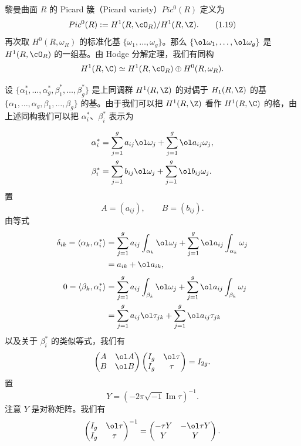 黎曼曲面 $R$ 的 Picard 簇（Picard variety）$Pic^0(R)$ 定义为
\begin{equation}
  Pic^0(R):=H^1(R,\cO_R)/H^1(R,\Z). \tag{1.19}
\end{equation}
再次取 $H^0(R,\omega_R)$ 的标准化基 $\{\omega_1,\dots,\omega_g\}$。那么 $\{\ol\omega_1,\dots,\ol\omega_g\}$ 是 $H^1(R,\cO_R)$ 的一组基。由 Hodge 分解定理，我们有同构
\[
  H^1(R,\C)\simeq H^1(R,\cO_R)\oplus H^0(R,\omega_R).
\]
\begin{sloppypar}设 $\{\alpha_1^*,\dots,\alpha_g^*,\beta_1^*,\dots,\beta_g^*\}$ 是上同调群 $H^1(R,\Z)$ 的对偶于 $H_1(R,\Z)$ 的基 $\{\alpha_1,\dots,\alpha_g,\beta_1,\dots,\beta_g\}$ 的基。由于我们可以把 $H^1(R,\Z)$ 看作 $H^1(R,\C)$ 的格，由上述同构我们可以把 $\alpha_i^*$、$\beta_i^*$ 表示为
\end{sloppypar}
\[
\begin{aligned}
  \alpha_i^* &= \sum_{j=1}^{g}a_{ij}\ol\omega_j+\sum_{j=1}^{g}\ol a_{ij}\omega_j,\\
  \beta_i^* &= \sum_{j=1}^{g}b_{ij}\ol\omega_j+\sum_{j=1}^{g}\ol b_{ij}\omega_j .
\end{aligned}
\]
置
\[
  A=(a_{ij}),\qquad B=(b_{ij}).
\]
由等式
\[
\begin{aligned}
  \delta_{ik}=\langle\alpha_k,\alpha_i^*\rangle
  &= \sum_{j=1}^{g}a_{ij}\int_{\alpha_k}\ol\omega_j+\sum_{j=1}^{g}\ol a_{ij}\int_{\alpha_k}\omega_j\\
  &= a_{ik}+\ol a_{ik},\\[1mm]
  0=\langle\beta_k,\alpha_i^*\rangle
  &= \sum_{j=1}^{g}a_{ij}\int_{\beta_k}\ol\omega_j+\sum_{j=1}^{g}\ol a_{ij}\int_{\beta_k}\omega_j\\
  &= \sum_{j=1}^{g}a_{ij}\ol\tau_{jk}+\sum_{j=1}^{g}\ol a_{ij}\tau_{jk}
\end{aligned}
\]
以及关于 $\beta_i^*$ 的类似等式，我们有
\[
  \begin{pmatrix} A & \ol A\\ B & \ol B\end{pmatrix}
  \begin{pmatrix} I_g & \ol\tau\\ I_g & \tau\end{pmatrix}=I_{2g}.
\]
置
\begin{equation}
  Y=(-2\pi\sqrt{-1}\operatorname{Im}\tau)^{-1}. \tag{1.20}
\end{equation}
注意 $Y$ 是对称矩阵。我们有
\[
  \begin{pmatrix} I_g & \ol\tau\\ I_g & \tau\end{pmatrix}^{-1}
  =\begin{pmatrix} -\tau Y & -\ol\tau Y\\ Y & Y\end{pmatrix}.
\]

